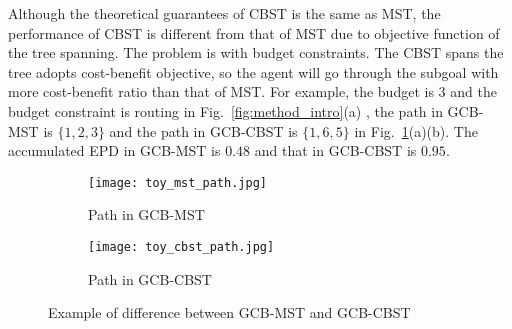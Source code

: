 Although the theoretical guarantees of CBST is the same as MST, the performance of CBST is different from that of MST due to objective function of the tree spanning.
The problem is with budget constraints.
The CBST spans the tree adopts cost-benefit objective, so the agent will go through the subgoal with more cost-benefit ratio than that of MST.
For example, the budget is $3$ and the budget constraint is routing in Fig.~\ref{fig:method_intro}(a)
, the path in GCB-MST is $\{1, 2, 3 \}$ and the path in GCB-CBST is $\{1,6,5 \}$ in Fig.~\ref{fig:toy_mst_cbst}(a)(b).
The accumulated EPD in GCB-MST is $0.48$ and that in GCB-CBST is $0.95.$







\begin{figure}[htbp]
 \begin{center}
\begin{subfigure}{.44\textwidth}
  \centering
  \texttt{[image: toy\_mst\_path.jpg]}
  \caption{Path in GCB-MST}
\end{subfigure}
\begin{subfigure}{.44\textwidth}
  \centering
  \texttt{[image: toy\_cbst\_path.jpg]}
  \caption{Path in GCB-CBST}
\end{subfigure}
\caption{Example of difference between GCB-MST and GCB-CBST}
\label{fig:toy_mst_cbst}
 \end{center}
 \end{figure} 